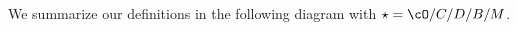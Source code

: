 \documentclass[12pt,a4paper]{amsart}
\def\eDD{\overline{\nabla}}
\numberwithin{equation}{section}
\theoremstyle{remark}
\def\edrc{\mathrm{DRC}^{\mathrm e}}
\def\drc{\mathrm{DRC}}
\def\LS{\mathrm{LS}}
\def\LLS{\mathrm{{}^{\ell} LS}}
\def\Unip{\mathrm{Unip}}
\begin{document}
We summarize our definitions in the following diagram with $\star=\cO/C/D/B/M$.
\end{document}

